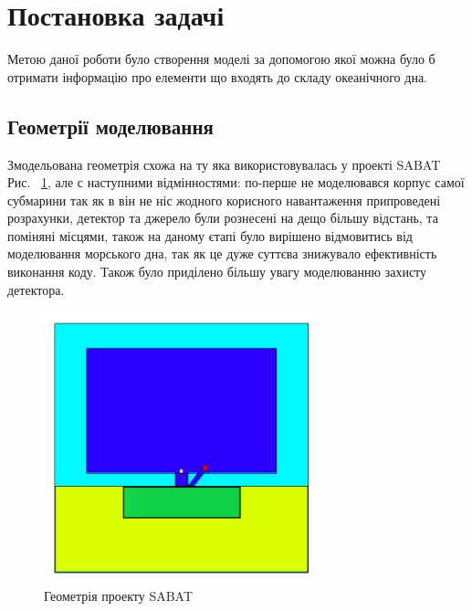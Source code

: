 \documentclass[a4paper, 14pt]{article}
\numberwithin{equation}{section}
\numberwithin{table}{section}
\begin{document}
\newpage
\section{Постановка задачі}
\setcounter{figure}{0}
Метою даної роботи було створення моделі за допомогою якої можна було б отримати інформацію про елементи що входять до складу океанічного дна.
\subsection {Геометрії моделювання}
Змодельована геометрія схожа на ту яка використовувалась у проекті SABAT Рис. ~\ref{ris:SabatG}, але с наступними відмінностями: по-перше не моделювався корпус самої субмарини так як в він не ніс жодного корисного навантаження припроведені розрахунки, детектор та джерело були рознесені на дещо більшу відстань, та поміняні місцями, також на даному єтапі було вирішено відмовитись від моделювання морського дна, так як це дуже суттєва знижувало ефективність виконання коду. Також було приділено більшу увагу моделюванню захисту детектора.
\begin{figure}[hbt!]
	\centering \includegraphics[width=0.7\textwidth]{images/sabatGeometry.png}
	\caption{Геометрія проекту SABAT} 
	\label{ris:SabatG}	
\end{figure}
\end{document}
